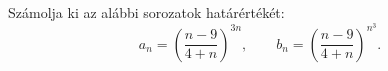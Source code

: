 \documentclass[11pt]{scrartcl}
\begin{document}
Számolja ki az alábbi sorozatok határértékét:
\[
	a_n = \left(\frac{n - 9}{4 + n}\right)^{3n}, \qquad
	b_n = \left(\frac{n - 9}{4 + n}\right)^{n^3}.
\]
\end{document}
